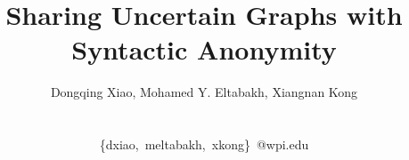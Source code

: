 \documentclass{vldb}
\theoremstyle{plain}
\begin{document}

\title{Sharing Uncertain Graphs with Syntactic Anonymity}

\author{Dongqing Xiao,  Mohamed Y. Eltabakh, Xiangnan Kong \\ 
 \\
 \\
\eaddfnt
\{dxiao,~meltabakh,~xkong\}~@wpi.edu}  




\maketitle
\end{document}
